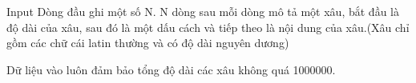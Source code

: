 Input
Dòng đầu ghi một số N. N dòng sau mỗi dòng mô tả một xâu, bắt đầu là độ dài của xâu, sau đó là một dấu cách và tiếp theo là nội dung của xâu.(Xâu chỉ gồm các chữ cái latin thường và có độ dài nguyên dương)   


   Dữ liệu vào luôn đảm bảo tổng độ dài các xâu không quá 1000000.